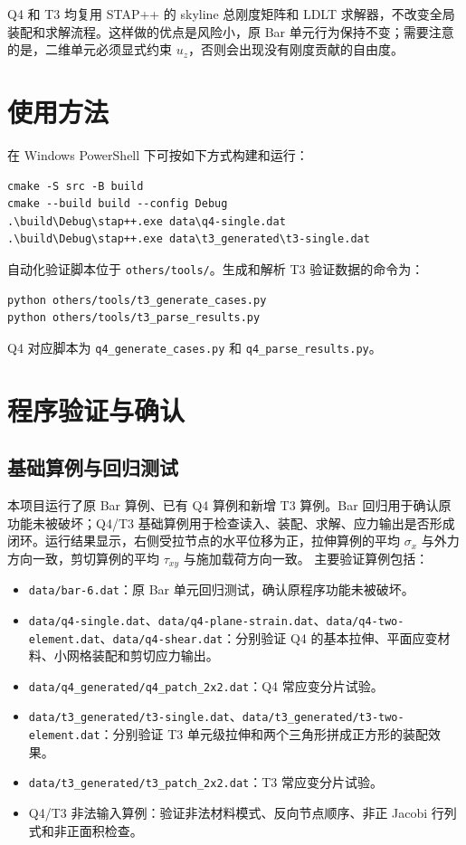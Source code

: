 ﻿\documentclass[UTF8,11pt,a4paper]{ctexart}
\begin{document}
Q4 和 T3 均复用 STAP++ 的 skyline 总刚度矩阵和 LDLT 求解器，不改变全局装配和求解流程。这样做的优点是风险小，原 Bar 单元行为保持不变；需要注意的是，二维单元必须显式约束 $u_z$，否则会出现没有刚度贡献的自由度。

\section{使用方法}
在 Windows PowerShell 下可按如下方式构建和运行：
\begin{lstlisting}
cmake -S src -B build
cmake --build build --config Debug
.\build\Debug\stap++.exe data\q4-single.dat
.\build\Debug\stap++.exe data\t3_generated\t3-single.dat
\end{lstlisting}
自动化验证脚本位于 \texttt{others/tools/}。生成和解析 T3 验证数据的命令为：
\begin{lstlisting}
python others/tools/t3_generate_cases.py
python others/tools/t3_parse_results.py
\end{lstlisting}
Q4 对应脚本为 \texttt{q4\_generate\_cases.py} 和 \texttt{q4\_parse\_results.py}。

\section{程序验证与确认}
\subsection{基础算例与回归测试}
本项目运行了原 Bar 算例、已有 Q4 算例和新增 T3 算例。Bar 回归用于确认原功能未被破坏；Q4/T3 基础算例用于检查读入、装配、求解、应力输出是否形成闭环。运行结果显示，右侧受拉节点的水平位移为正，拉伸算例的平均 $\sigma_x$ 与外力方向一致，剪切算例的平均 $\tau_{xy}$ 与施加载荷方向一致。
主要验证算例包括：
\begin{itemize}
  \item \texttt{data/bar-6.dat}：原 Bar 单元回归测试，确认原程序功能未被破坏。
  \item \texttt{data/q4-single.dat}、\texttt{data/q4-plane-strain.dat}、\texttt{data/q4-two-element.dat}、\texttt{data/q4-shear.dat}：分别验证 Q4 的基本拉伸、平面应变材料、小网格装配和剪切应力输出。
  \item \texttt{data/q4\_generated/q4\_patch\_2x2.dat}：Q4 常应变分片试验。
  \item \texttt{data/t3\_generated/t3-single.dat}、\texttt{data/t3\_generated/t3-two-element.dat}：分别验证 T3 单元级拉伸和两个三角形拼成正方形的装配效果。
  \item \texttt{data/t3\_generated/t3\_patch\_2x2.dat}：T3 常应变分片试验。
  \item Q4/T3 非法输入算例：验证非法材料模式、反向节点顺序、非正 Jacobi 行列式和非正面积检查。
\end{itemize}
\end{document}

